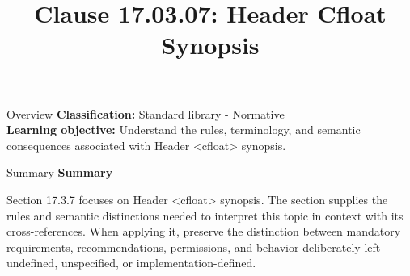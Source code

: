 \documentclass[10pt,letterpaper]{article}
\title{Clause 17.03.07: Header Cfloat Synopsis}
\author{}
\date{}
\begin{document}
\maketitle
\begin{CornellOverviewBox}{Overview}
\textbf{Classification:} Standard library - Normative\\[2pt]
\textbf{Learning objective:} Understand the rules, terminology, and semantic consequences associated with Header <cfloat> synopsis.
\end{CornellOverviewBox}\begin{CornellSummaryBox}{Summary}
{\sffamily\bfseries\color{Accent} Summary}\par\vspace{3pt}Section 17.3.7 focuses on Header <cfloat> synopsis. The section supplies the rules and semantic distinctions needed to interpret this topic in context with its cross-references. When applying it, preserve the distinction between mandatory requirements, recommendations, permissions, and behavior deliberately left undefined, unspecified, or implementation-defined.
\end{CornellSummaryBox}
\end{document}
